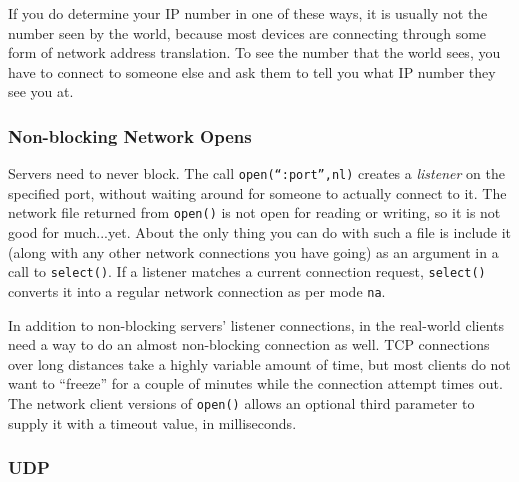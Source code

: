 If you do determine your IP number in one of these ways, it is usually not
the number seen by the world, because most devices are connecting through
some form of network address translation.
To see the number that the world sees, you have to connect to
someone else and ask them to tell you what IP number they see you at.


\subsubsection[Non{}-blocking Network Opens]{\sffamily Non-blocking
Network Opens}
Servers need to never block. The call
\texttt{open({\textquotedblleft}:port{\textquotedblright},{\textquotedbl}nl{\textquotedbl})}
creates a \textit{listener} on the specified port, without waiting
around for someone to actually connect to it. The network file returned
from \texttt{open()} is not open for reading or writing, so it is not
good for much...yet. About the only thing you can do with such a file
is include it (along with any other network connections you have going)
as an argument in a call to \texttt{select()}. If a listener matches a
current connection request, \texttt{select()} converts it into a
regular network connection as per mode
\texttt{{\textquotedbl}na{\textquotedbl}}.

In addition to non-blocking servers' listener connections, in the real-world
clients need a way to do an almost non-blocking connection as well.
TCP connections over long distances take a highly variable amount of time,
but most clients do not want to ``freeze'' for a couple of minutes while
the connection attempt times out. The network client versions of \texttt{open()}
allows an optional third parameter to supply it with a timeout value,
in milliseconds.

\subsubsection{UDP}

